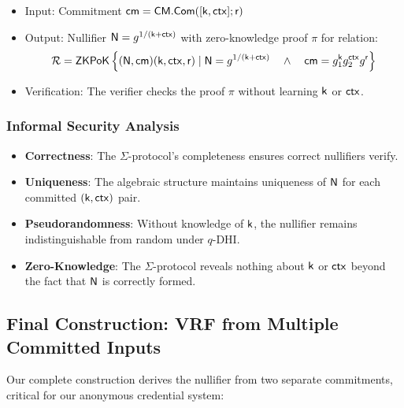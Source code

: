 \begin{itemize}
    \item Input: Commitment $\mathsf{cm} = \mathsf{CM.Com}([\mathsf{k}, \mathsf{ctx}]; \mathsf{r})$
    \item Output: Nullifier $\mathsf{N} = g^{1/(\mathsf{k} + \mathsf{ctx})}$ with zero-knowledge proof $\pi$ for relation:
    \[
    \mathcal{R} = {\mathsf{ZKPoK}} \left\{ (\mathsf{N}, \mathsf{cm})(\mathsf{k}, \mathsf{ctx}, \mathsf{r}) \mid \mathsf{N} = g^{1/(\mathsf{k} + \mathsf{ctx})} \quad \wedge \quad \mathsf{cm} = g_1^{\mathsf{k}} g_2^{\mathsf{ctx}}g^{\mathsf{r}}  \right\}
    \]
    \item Verification: The verifier checks the proof $\pi$ without learning $\mathsf{k}$ or $\mathsf{ctx}$.
\end{itemize}

\subsubsection{Informal Security Analysis}
\begin{itemize}
    \item \textbf{Correctness}: The $\Sigma$-protocol's completeness ensures correct nullifiers verify.
    \item \textbf{Uniqueness}: The algebraic structure maintains uniqueness of $\mathsf{N}$ for each committed $(\mathsf{k},\mathsf{ctx})$ pair.
    \item \textbf{Pseudorandomness}: Without knowledge of $\mathsf{k}$, the nullifier remains indistinguishable from random under $q$-DHI.
    \item \textbf{Zero-Knowledge}: The $\Sigma$-protocol reveals nothing about $\mathsf{k}$ or $\mathsf{ctx}$ beyond the fact that $\mathsf{N}$ is correctly formed.
\end{itemize}

\subsection{Final Construction: VRF from Multiple Committed Inputs}
Our complete construction derives the nullifier from two separate commitments, critical for our anonymous credential system:

